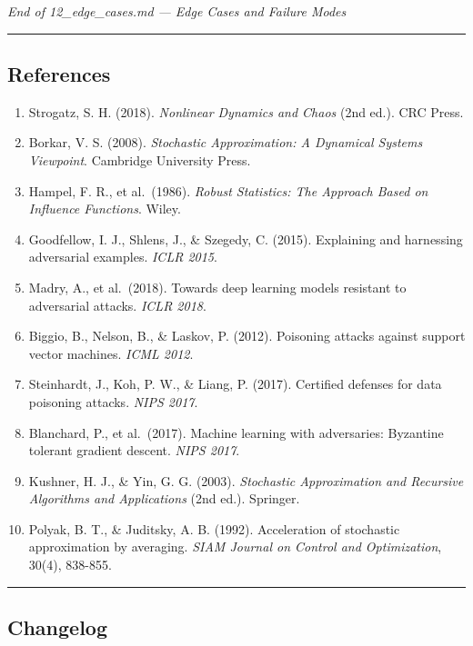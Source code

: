 \documentclass[
  12pt,
]{article}
\providecommand{\tightlist}{%
  \setlength{\itemsep}{0pt}\setlength{\parskip}{0pt}}
\begin{document}
\emph{End of 12\_edge\_cases.md --- Edge Cases and Failure Modes}

\begin{center}\rule{0.5\linewidth}{0.5pt}\end{center}

\subsection{References}\label{references}

\begin{enumerate}
\def\labelenumi{\arabic{enumi}.}
\tightlist
\item
  Strogatz, S. H. (2018). \emph{Nonlinear Dynamics and Chaos} (2nd ed.).
  CRC Press.
\item
  Borkar, V. S. (2008). \emph{Stochastic Approximation: A Dynamical
  Systems Viewpoint}. Cambridge University Press.
\item
  Hampel, F. R., et al.~(1986). \emph{Robust Statistics: The Approach
  Based on Influence Functions}. Wiley.
\item
  Goodfellow, I. J., Shlens, J., \& Szegedy, C. (2015). Explaining and
  harnessing adversarial examples. \emph{ICLR 2015}.
\item
  Madry, A., et al.~(2018). Towards deep learning models resistant to
  adversarial attacks. \emph{ICLR 2018}.
\item
  Biggio, B., Nelson, B., \& Laskov, P. (2012). Poisoning attacks
  against support vector machines. \emph{ICML 2012}.
\item
  Steinhardt, J., Koh, P. W., \& Liang, P. (2017). Certified defenses
  for data poisoning attacks. \emph{NIPS 2017}.
\item
  Blanchard, P., et al.~(2017). Machine learning with adversaries:
  Byzantine tolerant gradient descent. \emph{NIPS 2017}.
\item
  Kushner, H. J., \& Yin, G. G. (2003). \emph{Stochastic Approximation
  and Recursive Algorithms and Applications} (2nd ed.). Springer.
\item
  Polyak, B. T., \& Juditsky, A. B. (1992). Acceleration of stochastic
  approximation by averaging. \emph{SIAM Journal on Control and
  Optimization}, 30(4), 838-855.
\end{enumerate}

\begin{center}\rule{0.5\linewidth}{0.5pt}\end{center}

\subsection{Changelog}\label{changelog}
\end{document}
